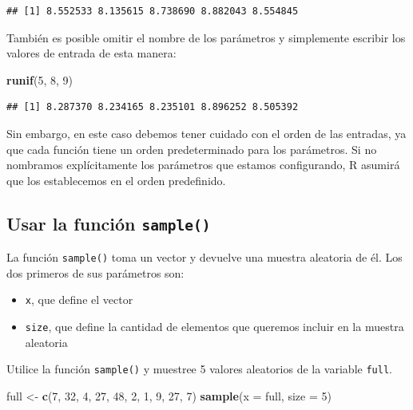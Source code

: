 \documentclass[
]{book}
\newenvironment{Shaded}{\begin{snugshade}}{\end{snugshade}}
\newcommand{\DataTypeTok}[1]{\textcolor[rgb]{0.13,0.29,0.53}{#1}}
\newcommand{\DecValTok}[1]{\textcolor[rgb]{0.00,0.00,0.81}{#1}}
\newcommand{\KeywordTok}[1]{\textcolor[rgb]{0.13,0.29,0.53}{\textbf{#1}}}
\newcommand{\NormalTok}[1]{#1}
\newcommand{\StringTok}[1]{\textcolor[rgb]{0.31,0.60,0.02}{#1}}
\providecommand{\tightlist}{%
  \setlength{\itemsep}{0pt}\setlength{\parskip}{0pt}}
\begin{document}
\begin{verbatim}
## [1] 8.552533 8.135615 8.738690 8.882043 8.554845
\end{verbatim}

También es posible omitir el nombre de los parámetros y simplemente escribir los valores de entrada de esta manera:

\begin{Shaded}
\begin{Highlighting}[]
\KeywordTok{runif}\NormalTok{(}\DecValTok{5}\NormalTok{, }\DecValTok{8}\NormalTok{, }\DecValTok{9}\NormalTok{)}
\end{Highlighting}
\end{Shaded}

\begin{verbatim}
## [1] 8.287370 8.234165 8.235101 8.896252 8.505392
\end{verbatim}

Sin embargo, en este caso debemos tener cuidado con el orden de las entradas, ya que cada función tiene un orden predeterminado para los parámetros. Si no nombramos explícitamente los parámetros que estamos configurando, R asumirá que los establecemos en el orden predefinido.

\hypertarget{usar-la-funciuxf3n-sample}{%
\subsection{\texorpdfstring{Usar la función \texttt{sample()}}{Usar la función sample()}}\label{usar-la-funciuxf3n-sample}}

La función \texttt{sample()} toma un vector y devuelve una muestra aleatoria de él. Los dos primeros de sus parámetros son:

\begin{itemize}
\tightlist
\item
  \texttt{x}, que define el vector
\item
  \texttt{size}, que define la cantidad de elementos que queremos incluir en la muestra aleatoria
\end{itemize}

Utilice la función \texttt{sample()} y muestree 5 valores aleatorios de la variable \texttt{full}.

\begin{Shaded}
\begin{Highlighting}[]
\NormalTok{full <-}\StringTok{ }\KeywordTok{c}\NormalTok{(}\DecValTok{7}\NormalTok{, }\DecValTok{32}\NormalTok{, }\DecValTok{4}\NormalTok{, }\DecValTok{27}\NormalTok{, }\DecValTok{48}\NormalTok{, }\DecValTok{2}\NormalTok{, }\DecValTok{1}\NormalTok{, }\DecValTok{9}\NormalTok{, }\DecValTok{27}\NormalTok{, }\DecValTok{7}\NormalTok{)}
\KeywordTok{sample}\NormalTok{(}\DataTypeTok{x =}\NormalTok{ full, }\DataTypeTok{size =} \DecValTok{5}\NormalTok{)}
\end{Highlighting}
\end{Shaded}
\end{document}
